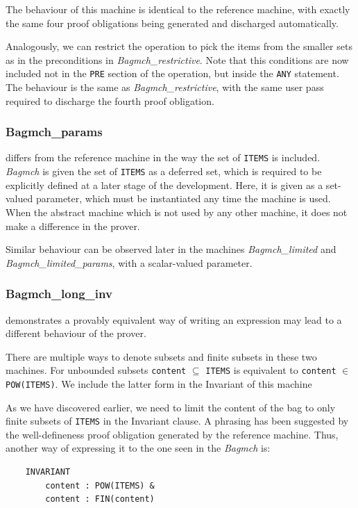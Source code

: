 \documentclass[12pt,journal,duplex]{IEEEtran}
\begin{document}
	The behaviour of this machine is identical to the reference machine, with exactly the same four proof obligations being generated and discharged automatically.

	Analogously, we can restrict the operation to pick the items from the smaller sets as in the preconditions in \emph{Bagmch\_restrictive}. Note that this conditions are now included not in the \texttt{PRE} section of the operation, but inside the \texttt{ANY} statement. The behaviour is the same as \emph{Bagmch\_restrictive}, with the same user pass required to discharge the fourth proof obligation.

	\subsubsection{Bagmch\_params} differs from the reference machine in the way the set of \texttt{ITEMS} is included. \emph{Bagmch} is given the set of \texttt{ITEMS} as a deferred set, which is required to be explicitly defined at a later stage of the development. Here, it is given as a set-valued parameter, which must be instantiated any time the machine is used.\cite{b-method} When the abstract machine which is not used by any other machine, it does not make a difference in the prover.

	Similar behaviour can be observed later in the machines \emph{Bagmch\_limited} and \emph{Bagmch\_limited\_params}, with a scalar-valued parameter.

	\subsubsection{Bagmch\_long\_inv} demonstrates a provably equivalent way of writing an expression may lead to a different behaviour of the prover.

	There are multiple ways to denote subsets and finite subsets in these two machines. For unbounded subsets \texttt{content} $\subseteq$ \texttt{ITEMS} is equivalent to \texttt{content} $\in$ \texttt{POW(ITEMS)}. We include the latter form in the Invariant of this machine

	As we have discovered earlier, we need to limit the content of the bag to only finite subsets of \texttt{ITEMS} in the Invariant clause. A phrasing has been suggested by the well-defineness proof obligation generated by the reference machine. Thus, another way of expressing it to the one seen in the \emph{Bagmch} is:

	\begin{lstlisting}
	INVARIANT
	    content : POW(ITEMS) &
		content : FIN(content)
	\end{lstlisting}
\end{document}
